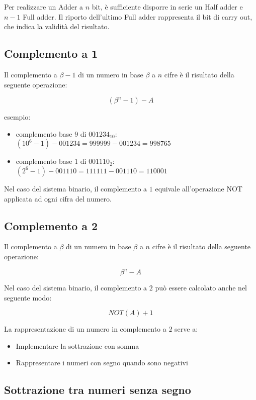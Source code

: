 \documentclass{article}
\begin{document}
\noindent
Per realizzare un Adder a $n$ bit, è sufficiente disporre in serie un Half adder e $n-1$ Full adder.
Il riporto dell'ultimo Full adder rappresenta il bit di carry out, che indica la validità del risultato.

\subsection{Complemento a 1}

Il complemento a $\beta - 1$ di un numero in base $\beta$ a $n$ cifre è il risultato della seguente operazione:

$$
(\beta^n - 1) - A
$$

\noindent
esempio:

\begin{itemize}
\item complemento base $9$ di $001234_{10}$: $(10^6 - 1) - 001234 = 999999 - 001234 = 998765$
\item complemento base $1$ di $001110_2$: $(2^6 - 1) - 001110 = 111111 - 001110 = 110001$
\end{itemize}

\noindent
Nel caso del sistema binario, il complemento a $1$ equivale all'operazione NOT applicata ad ogni cifra del numero.

\subsection{Complemento a 2}

Il complemento a $\beta$ di un numero in base $\beta$ a $n$ cifre è il risultato della seguente operazione:

$$
\beta^n - A
$$

\noindent
Nel caso del sistema binario, il complemento a $2$ può essere calcolato anche nel seguente modo:

$$
NOT(A) + 1
$$

\noindent
La rappresentazione di un numero in complemento a $2$ serve a:

\begin{itemize}
\item Implementare la sottrazione con somma
\item Rappresentare i numeri con segno quando sono negativi
\end{itemize}

\subsection{Sottrazione tra numeri senza segno}
\end{document}
